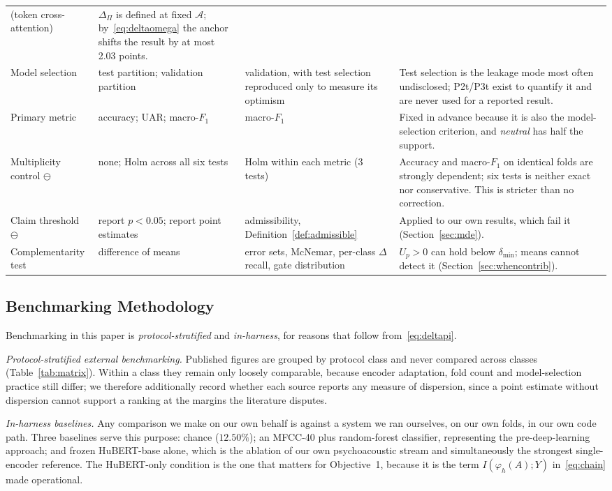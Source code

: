 \documentclass[journal,onecolumn,11pt,draftclsnofoot]{IEEEtran}   %
\begin{document}
\begin{table}[!t]
\begin{tabular}{@{}L{0.15\textwidth}L{0.24\textwidth}L{0.19\textwidth}L{0.33\textwidth}@{}}
(token cross-attention) &
$\Delta_\Pi$ is defined at fixed $\mathcal{A}$; by~\eqref{eq:deltaomega} the
anchor shifts the result by at most 2.03 points. \\
Model selection & test partition; validation partition &
validation, with test selection reproduced only to measure its optimism &
Test selection is the leakage mode most often undisclosed; P2t/P3t exist to
quantify it and are never used for a reported result. \\
Primary metric & accuracy; UAR; macro-$F_1$ & macro-$F_1$ &
Fixed in advance because it is also the model-selection criterion, and
\emph{neutral} has half the support. \\
Multiplicity control $\ominus$ & none; Holm across all six tests &
Holm within each metric (3 tests) &
Accuracy and macro-$F_1$ on identical folds are strongly dependent; six tests
is neither exact nor conservative. This is stricter than no correction. \\
Claim threshold $\ominus$ & report $p<0.05$; report point estimates &
admissibility, Definition~\ref{def:admissible} &
Applied to our own results, which fail it (Section~\ref{sec:mde}). \\
Complementarity test & difference of means & error sets, McNemar, per-class
$\Delta$recall, gate distribution &
$U_p > 0$ can hold below $\delta_{\min}$; means cannot detect it
(Section~\ref{sec:whencontrib}). \\
\bottomrule
\end{tabular}
\end{table}

\subsection{Benchmarking Methodology}
\label{sec:benchmark-method}
Benchmarking in this paper is \emph{protocol-stratified} and \emph{in-harness},
for reasons that follow from~\eqref{eq:deltapi}.

\emph{Protocol-stratified external benchmarking.} Published figures are grouped
by protocol class and never compared across classes
(Table~\ref{tab:matrix}). Within a class they remain only loosely
comparable, because encoder adaptation, fold count and model-selection practice
still differ; we therefore additionally record whether each source reports any
measure of dispersion, since a point estimate without dispersion cannot support
a ranking at the margins the literature disputes.

\emph{In-harness baselines.} Any comparison we make on our own behalf is against
a system we ran ourselves, on our own folds, in our own code path. Three
baselines serve this purpose: chance ($12.50\%$); an MFCC-40 plus random-forest
classifier, representing the pre-deep-learning approach; and frozen HuBERT-base
alone, which is the ablation of our own psychoacoustic stream and simultaneously
the strongest single-encoder reference. The HuBERT-only condition is the one
that matters for Objective~1, because it is the term $I(\varphi_h(A);Y)$
in~\eqref{eq:chain} made operational.
\end{document}
